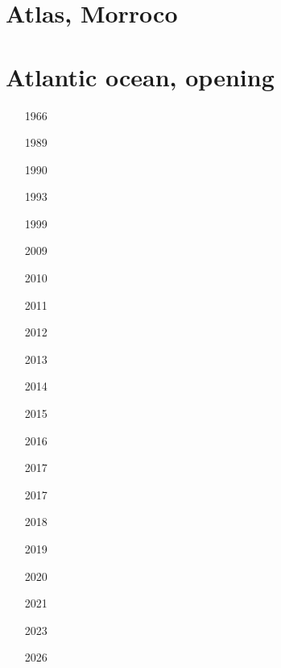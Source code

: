 \section{Atlas, Morroco}

\begin{small}
\begin{itemize}
\item[\twothousandtwelve]
\item[\twothousandfourteen]
\item[\twothousandtwentythree]
\end{itemize}
\end{small}

\section{Atlantic ocean, opening}

\begin{small}
\begin{itemize}
\item[1966]
\item[1989]
\item[1990]
\item[1993]
\item[1999]
\item[2009]
\item[2010]
\item[2011]
\item[2012]
\item[2013]
\item[2014]
\item[2015]
\item[2016]
\item[2017]
\item[2017]
\item[2018]
\item[2019]
\item[2020]
\item[2021]
\item[2023]
\item[2026]
\end{itemize}
\end{small}

